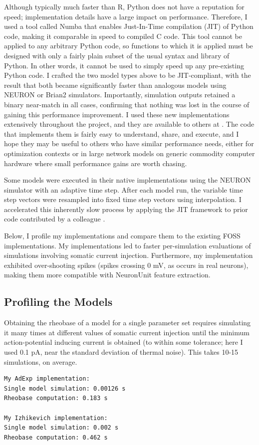 Although typically much faster than R, Python does not have a reputation for speed; implementation details have a large impact on performance.
Therefore, I used a tool called Numba \citep{lam2015numba} that enables Just-In-Time compilation (JIT) of Python code, making it comparable in speed to compiled C code.
This tool cannot be applied to any arbitrary Python code, so functions to which it is applied must be designed with only a fairly plain subset of the usual syntax and library of Python.
In other words, it cannot be used to simply speed up any pre-existing Python code.
I crafted the two model types above to be JIT-compliant, with the result that both became significantly faster than analogous models using NEURON or Brian2 simulators.
Importantly, simulation outputs retained a binary near-match in all cases, confirming that nothing was lost in the course of gaining this performance improvement.
I used these new implementations extensively throughout the project, and they are available to others at \cite{jithub}. 
The code that implements them is fairly easy to understand, share, and execute, and I hope they may be useful to others who have similar performance needs, either for optimization contexts or in large network models on generic commodity computer hardware where small performance gains are worth chasing. 

Some models were executed in their native implementations using the NEURON simulator with an adaptive time step.
After each model run, the variable time step vectors were resampled into fixed time step vectors using interpolation.
I accelerated this inherently slow process by applying the JIT framework to prior code contributed by a colleague \citep{birgiolas2019towards}.

Below, I profile my implementations and compare them to the existing FOSS implementations.
My implementations led to faster per-simulation evaluations of simulations involving somatic current injection. 
Furthermore, my implementation exhibited over-shooting spikes (spikes crossing 0 mV, as occurs in real neurons), making them more compatible with NeuronUnit feature extraction.

\subsection{Profiling the Models}
Obtaining the rheobase of a model for a single parameter set requires simulating it many times at different values of somatic current injection until the minimum action-potential inducing current is obtained (to within some tolerance; here I used 0.1 pA, near the standard deviation of thermal noise).
This takes 10-15 simulations, on average.
\begin{verbatim}
My AdExp implementation:
Single model simulation: 0.00126 s
Rheobase computation: 0.183 s

My Izhikevich implementation:
Single model simulation: 0.002 s
Rheobase computation: 0.462 s
\end{verbatim}

